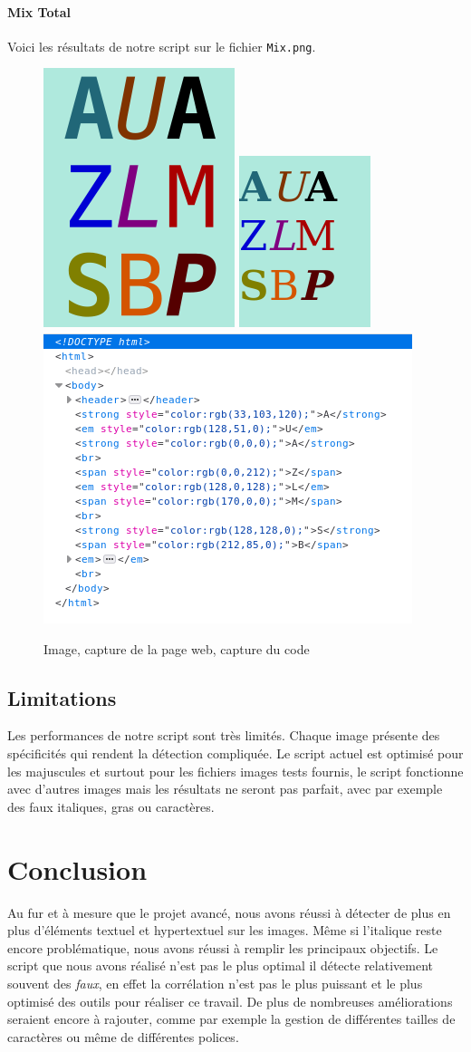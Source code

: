 \documentclass[a4paper,12pt,titlepage]{report}
\begin{document}
	\paragraph{Mix Total}
	Voici les résultats de notre script sur le fichier \texttt{Mix.png}.
	\begin{figure}[h]
	\centering
		\includegraphics[height=0.25\textwidth]{../illus/Mix.png}
		\includegraphics[height=0.25\textwidth]{../illus/MixR.png}
		\includegraphics[height=0.25\textwidth]{../illus/MixC.png}
		\caption{Image, capture de la page web, capture du code}
	\end{figure}
	\subsection{Limitations}
	Les performances de notre script sont très limités. Chaque image présente des spécificités qui rendent la détection compliquée. Le script actuel est optimisé pour les majuscules et surtout pour les fichiers images tests fournis, le script fonctionne avec d'autres images mais les résultats ne seront pas parfait, avec par exemple des faux italiques, gras ou caractères. 
	\section{Conclusion}
	Au fur et à mesure que le projet avancé, nous avons réussi à détecter de plus en plus d'éléments textuel et hypertextuel sur les images. Même si l'italique reste encore problématique, nous avons réussi à remplir les principaux objectifs.
	Le script que nous avons réalisé n'est pas le plus optimal il détecte relativement souvent des \textit{faux}, en effet la corrélation n'est pas le plus puissant et le plus optimisé des outils pour réaliser ce travail.
	De plus de nombreuses améliorations seraient encore à rajouter, comme par exemple la gestion de différentes tailles de caractères ou même de différentes polices.
	\listoffigures
	
	\lstlistoflistings
\end{document}
